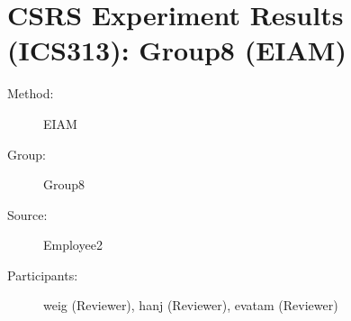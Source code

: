 
%          
	  
\chapter {CSRS Experiment Results (ICS313): Group8 (EIAM)}
\small

\begin{description}
\item [Method:] EIAM
\item [Group:] Group8
\item [Source:] Employee2
\item [Participants:] weig (Reviewer), hanj (Reviewer), evatam (Reviewer)
\end{description}
